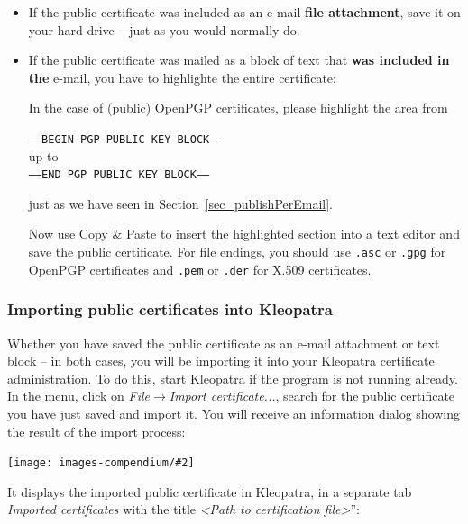 \documentclass[a4paper,11pt,oneside,openright,titlepage]{scrbook}
\newcommand{\Menu}[1]{\textit{#1}}
\newcommand{\Filename}[1]{\small{\texttt{#1}}\normalsize}
\newcommand{\Email}{e-mail}
\newcommand{\IncludeImage}[2][]{
\begin{center}
  \texttt{[image: images-compendium/\#2]}%
\end{center}
}
\begin{document}
\begin{itemize}

\item If the public certificate was included as an \Email{} \textbf{file
    attachment}, save it on your hard drive -- just as you would
    normally do.

\item If the public certificate was mailed as a block of text
    that \textbf{was included in the} \Email{}, you have to
    highlighte the entire certificate:

    In the case of (public)
    OpenPGP certificates, please highlight the area from

    \Filename{-----BEGIN PGP PUBLIC KEY BLOCK-----}\\ up to\\
    \Filename{-----END PGP PUBLIC KEY BLOCK-----}

    just as we have seen in Section~\ref{sec_publishPerEmail}.

    Now use Copy \&  Paste to
    insert the highlighted section into a text editor and save the
    public certificate. For file endings, you should use
     \Filename{.asc} or \Filename{.gpg} for
    OpenPGP certificates and \Filename{.pem} or \Filename{.der}
    for X.509 certificates.

\end{itemize}

\clearpage
\subsubsection{Importing public certificates into Kleopatra}

Whether you have saved the public certificate as an \Email{}
attachment or text block -- in both cases, you will be importing it
into your Kleopatra certificate administration. To do this, start
Kleopatra if the program is not running already. In the menu, click
on \Menu{File$\rightarrow$Import certificate...}, search for
the public certificate you have just saved and import it. You will
receive an information dialog showing the result of the import
process:

\IncludeImage[width=0.5\textwidth]{sc-kleopatra-import-certificate_en}

It displays the imported public certificate in Kleopatra, in a
separate tab \Menu{Imported certificates} with the title
\Menu{<Path to certification file>}'':
\end{document}
